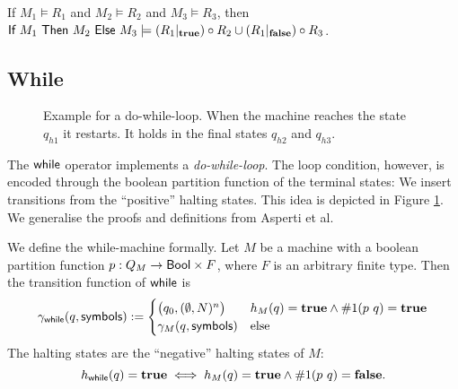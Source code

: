 \documentclass{psartcl}
\begin{document}
\begin{corollary}
  \label{lem:if}
  If $M_1 \vDash R_1$ and $M_2 \vDash R_2$ and $M_3 \vDash R_3$, then
  $\textsf{If}~M_1~\textsf{Then}~M_2~\textsf{Else}~M_3 \models (R_1 |_{\mathbf{true}}) \circ R_2 \cup (R_1 |_{\mathbf{false}}) \circ R_3$.
\end{corollary}


\subsection{While}

\begin{figure}
  \center
  \caption{Example for a do-while-loop.  When the machine reaches the state $q_{h1}$ it restarts.  It holds in the final states $q_{h2}$ and $q_{h3}$.}
  \label{fig:while-example}
\end{figure}

The $\textsf{while}$ operator implements a \emph{do-while-loop}.  The loop condition, however, is encoded through the boolean partition
function of the terminal states:  We insert transitions from the ``positive'' halting states.  This idea is depicted in Figure
\ref{fig:while-example}.  We generalise the proofs and definitions from Asperti et al.

We define the while-machine formally.  Let $M$ be a machine with a boolean partition function $p : Q_M \rightarrow \textsf{Bool} \times F$, where $F$ is an
arbitrary finite type.  Then the transition function of $\textsf{while}$ is
$$\gamma_{\textsf{while}} (q, \textsf{symbols}) :=
  \begin{cases}
    \bigl( q_0, (\emptyset, N)^n \bigr) & h_M(q) = \mathbf{true} \land \#1(p~q) = \mathbf{true} \\
    \gamma_M(q, \textsf{symbols})           & \text{else}
  \end{cases} $$
The halting states are the ``negative'' halting states of $M$:
$$h_{\textsf{while}}(q) = \mathbf{true} \iff h_M(q) = \mathbf{true} \land \#1(p~q) = \mathbf{false}.$$
\end{document}
